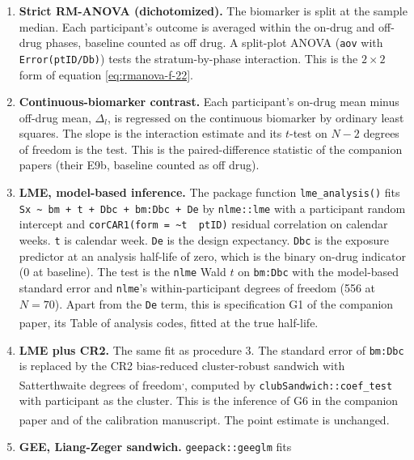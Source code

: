 \documentclass[
  11pt,
]{article}
\providecommand{\tightlist}{%
  \setlength{\itemsep}{0pt}\setlength{\parskip}{0pt}}
\begin{document}
\begin{enumerate}
\def\labelenumi{\arabic{enumi}.}
\tightlist
\item
  \textbf{Strict RM-ANOVA (dichotomized).} The biomarker is split at
  the sample median. Each participant's outcome is averaged within
  the on-drug and off-drug phases, baseline counted as off drug. A
  split-plot ANOVA (\texttt{aov} with \texttt{Error(ptID/Db)}) tests the
  stratum-by-phase interaction. This is the \(2 \times 2\) form of
  equation \eqref{eq:rmanova-f-22}.
\item
  \textbf{Continuous-biomarker contrast.} Each participant's on-drug
  mean minus off-drug mean, \(\Delta_l\), is regressed on the
  continuous biomarker by ordinary least squares. The slope is the
  interaction estimate and its \(t\)-test on \(N - 2\) degrees of
  freedom is the test. This is the paired-difference statistic of
  the companion papers (their E9b, baseline counted as off drug).
\item
  \textbf{LME, model-based inference.} The package function
  \texttt{lme\_analysis()} fits \texttt{Sx\ \textasciitilde{}\ bm\ +\ t\ +\ Dbc\ +\ bm:Dbc\ +\ De} by
  \texttt{nlme::lme} with a participant random intercept and
  \texttt{corCAR1(form\ =\ \textasciitilde{}t\ \textbar{}\ ptID)} residual correlation on calendar
  weeks. \texttt{t} is calendar week. \texttt{De} is the design expectancy.
  \texttt{Dbc} is the exposure predictor at an analysis half-life of
  zero, which is the binary on-drug indicator (0 at baseline). The
  test is the \texttt{nlme} Wald \(t\) on \texttt{bm:Dbc} with the model-based
  standard error and \texttt{nlme}'s within-participant degrees of
  freedom (556 at \(N = 70\)). Apart from the \texttt{De} term, this is
  specification G1 of the companion paper\textsuperscript{},
  its Table of analysis codes, fitted at the true half-life.
\item
  \textbf{LME plus CR2.} The same fit as
  procedure 3. The standard error of \texttt{bm:Dbc} is replaced by the
  CR2 bias-reduced cluster-robust sandwich with Satterthwaite
  degrees of freedom\textsuperscript{,}, computed by \texttt{clubSandwich::coef\_test} with
  participant as the cluster. This is the inference of G6 in the
  companion paper and of the calibration manuscript\textsuperscript{}. The point estimate is unchanged.
\item
  \textbf{GEE, Liang-Zeger sandwich.} \texttt{geepack::geeglm} fits

\end{enumerate}
\end{document}
